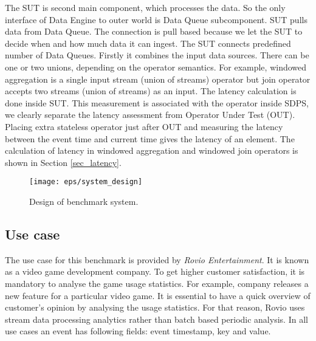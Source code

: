 The SUT is second main component, which processes the data. So the only interface of Data Engine to outer world is Data Queue subcomponent. SUT pulls data from Data Queue. The connection is pull based because we let the SUT to decide when and how much data it can ingest. The SUT connects predefined number of Data Queues. Firstly it combines the input data sources. There can be one or two unions, depending on the operator semantics. For example, windowed aggregation is a single input stream (union of streams) operator but join operator accepts two streams (union of streams) as an input. The latency calculation is done inside SUT. This measurement is associated with the operator inside SDPS, we clearly separate the latency assessment from Operator Under Test (OUT). Placing extra stateless operator just after OUT and measuring the latency between the event time and current time gives the latency of an element. The calculation of latency in windowed aggregation and windowed join operators is shown in Section \ref{sec_latency}. 


%
%

\begin{figure*}[h]
\centering
\texttt{[image: eps/system\_design]}
\caption{Design of benchmark system.}
\label{fig_design}
\end{figure*}

\subsection{Use case}
The use case for this benchmark is provided by \textit{ Rovio Entertainment}. It is known as a video game development company. To get higher customer satisfaction, it is mandatory to analyse the game usage statistics. For example, company releases a new feature for a particular video game. It is essential to have a quick overview of customer's opinion by analysing the usage statistics. For that reason, Rovio uses stream data processing analytics rather than batch based periodic analysis.  In all use cases an event has following fields: event timestamp, key and value. 

